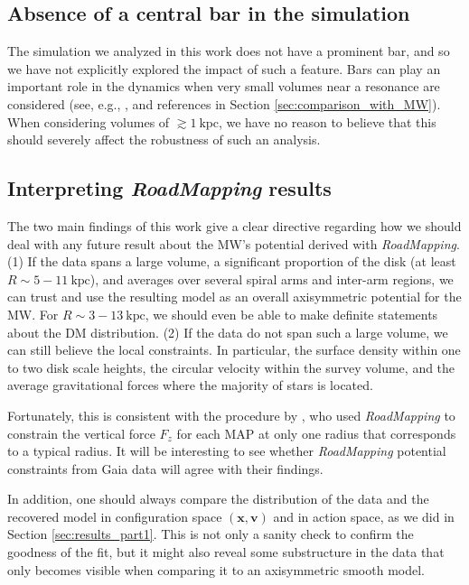 \documentclass[iop,revtex4,numberedappendix,appendixfloats]{emulateapj}
\newcommand{\vect}[1]{\boldsymbol{#1}}
\newcommand{\RM}{{\sl RoadMapping}}
\begin{document}
\subsection{Absence of a central bar in the simulation}

The simulation we analyzed in this work does not have a prominent bar, and so we have not explicitly explored the impact of such a feature. Bars can play an important role in the dynamics when very small volumes near a resonance are considered (see, e.g., \citealt{2000AJ....119..800D}, and references in Section \ref{sec:comparison_with_MW}). When considering volumes of $\gtrsim 1~\text{kpc}$, we have no reason to believe that this should severely affect the robustness of such an analysis.

\subsection{Interpreting \RM{} results}

The two main findings of this work give a clear directive regarding how we should deal with any future result about the MW's potential derived with \RM{}. (1) If the data spans a large volume, a significant proportion of the disk (at least $R\sim 5-11~\text{kpc}$), and averages over several spiral arms and inter-arm regions, we can trust and use the resulting model as an overall axisymmetric potential for the MW. For $R\sim 3-13~\text{kpc}$, we should even be able to make definite statements about the DM distribution. (2) If the data do not span such a large volume, we can still believe the local constraints. In particular, the surface density within one to two disk scale heights, the circular velocity within the survey volume, and the average gravitational forces where the majority of stars is located.

Fortunately, this is consistent with the procedure by \citet{2013ApJ...779..115B}, who used \RM{} to constrain the vertical force $F_z$ for each MAP at only one radius that corresponds to a typical radius. It will be interesting to see whether \RM{} potential constraints from Gaia data will agree with their findings.

In addition, one should always compare the distribution of the data and the recovered model in configuration space $(\vect{x},\vect{v})$ and in action space, as we did in Section \ref{sec:results_part1}. This is not only a sanity check to confirm the goodness of the fit, but it might also reveal some substructure in the data that only becomes visible when comparing it to an axisymmetric smooth model.
\end{document}

